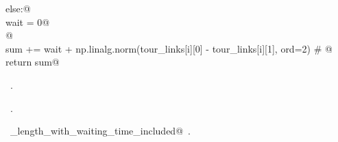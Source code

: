 \documentclass[11.5pt]{report}
\begin{document}
\begin{flushleft}
\begin{list}{}{}
\mbox{}\verb@          else:@\\
\mbox{}\verb@              wait = 0@\\
\mbox{}\verb@              @\\
\mbox{}\verb@          sum += wait + np.linalg.norm(tour_links[i][0] - tour_links[i][1], ord=2) # @\\
\mbox{}\verb@      return sum@\\
\mbox{}\verb@@{\NWsep}
\end{list}
\vspace{-1.5ex}
\footnotesize
\begin{list}{}{\setlength{\itemsep}{-\parsep}\setlength{\itemindent}{-\leftmargin}}
\item \NWtxtMacroDefBy\ .
\item \NWtxtMacroRefIn\ .
\item \NWtxtIdentsDefed\nobreak\  \verb@tour_length_with_waiting_time_included@\nobreak\ .
\item{}
\end{list}
\vspace{4ex}
\end{flushleft}
\end{document}
